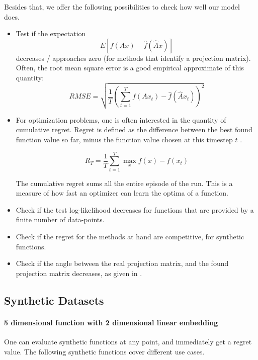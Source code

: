 Besides that, we offer the following possibilities to check how well our model does.

\begin{itemize}
\item Test if the expectation $$ E[ f(A x) - \hat{f}(\hat{A} x) ] $$ decreases / approaches zero (for methods that identify a projection matrix).
Often, the root mean square error is a good empirical approximate of this quantity:
\begin{equation}
RMSE = \sqrt{ \frac{1}{T} (\sum_{t=1}^{T} f(A x_t) - \hat{f}(\hat{A} x_t))^2 }
\end{equation}

\item For optimization problems, one is often interested in the quantity of cumulative regret.
Regret is defined as the difference between the best found function value so far, minus the function value chosen at this timestep $t$ \citep{RegretDef}.

\begin{equation}
R_T = \frac{1}{T} \sum_{t=1}^{T} \max_x f(x) - f(x_t)
\end{equation}

The cumulative regret sums all the entire episode of the run.
This is a measure of how fast an optimizer can learn the optima of a function.

\item Check if the test log-likelihood decreases for functions that are provided by a finite number of data-points.
\item Check if the regret for the methods at hand are competitive, for synthetic functions.
\item Check if the angle between the real projection matrix, and the found projection matrix decreases, as given in \citep{AngleMeasurement}.
\end{itemize}


\subsection{Synthetic Datasets} \label{syntheticFunction}
\paragraph{5 dimensional function with 2 dimensional linear embedding}

One can evaluate synthetic functions at any point, and immediately get a regret value.
The following synthetic functions cover different use cases.

